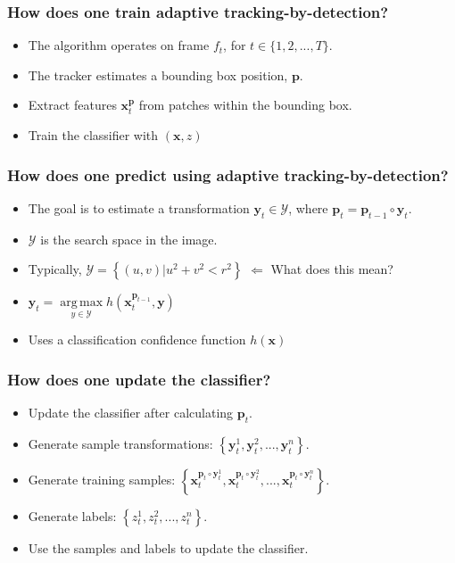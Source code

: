 \documentclass[mathserif,handout]{beamer}
\DeclareMathOperator*{\argmax}{arg\,max}
\begin{document}
\begin{frame}
    \frametitle{How does one train adaptive tracking-by-detection?}

    \begin{itemize}
        \item The algorithm operates on frame $f_t$, for $t \in \{1, 2, ..., T\}$.
        \item The tracker estimates a bounding box position, $\mathbf{p}$.
        \item Extract features $\mathbf{x}_t^\mathbf{p}$ from patches within the bounding box.
        \item Train the classifier with $(\mathbf{x}, z)$
    \end{itemize}

\end{frame}

\begin{frame}
    \frametitle{How does one predict using adaptive tracking-by-detection?}

    \begin{itemize}
        \item The goal is to estimate a transformation $\mathbf{y}_t \in
            \mathcal{Y}$, where $\mathbf{p}_t = \mathbf{p}_{t-1} \circ \mathbf{y}_t$.
        \item $\mathcal{Y}$ is the search space in the image.
        \item Typically, $\mathcal{Y} = \left\{ (u,v) | u^2 + v^2 < r^2 \right \}$
            \alert{$\Leftarrow$ What does this mean?}
        \item $\mathbf{y}_t = \argmax\limits_{y \in \mathcal{Y}} h \left(
            \mathbf{x}_t^{\mathbf{p}_{t-1}}, \mathbf{y} \right)$
        \item Uses a classification confidence function $h(\mathbf{x})$
    \end{itemize}
\end{frame}

\begin{frame}
    \frametitle{How does one update the classifier?}

    \begin{itemize}
        \item Update the classifier after calculating $\mathbf{p}_t$.
        \item Generate sample transformations: $\left\{ \mathbf{y}_t^1,
            \mathbf{y}_t^2, ..., \mathbf{y}_t^n \right\}$.
        \item Generate training samples: $\left\{
                \mathbf{x}_t^{\mathbf{p}_t \circ \mathbf{y}_t^1},
                \mathbf{x}_t^{\mathbf{p}_t \circ \mathbf{y}_t^2}, ...,
                \mathbf{x}_t^{\mathbf{p}_t \circ \mathbf{y}_t^n} \right\}$.
        \item Generate labels: $\left\{ z_t^1, z_t^2, ..., z_t^n \right\}$.
        \item Use the samples and labels to update the classifier.
    \end{itemize}
\end{frame}
\end{document}
